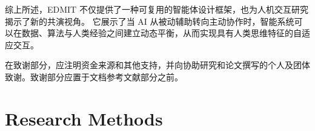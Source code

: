 \documentclass[sigconf]{acmart}
\begin{document}
综上所述，\textsc{EDMIT} 不仅提供了一种可复用的智能体设计框架，也为人机交互研究揭示了新的共演视角。  
它展示了当 AI 从被动辅助转向主动协作时，智能系统可以在数据、算法与人类经验之间建立动态平衡，从而实现具有人类思维特征的自适应交互。


\begin{acks}
在致谢部分，应注明资金来源和其他支持，并向协助研究和论文撰写的个人及团体致谢。致谢部分应置于文档参考文献部分之前。
\end{acks}





\appendix

\section{Research Methods}
\end{document}
